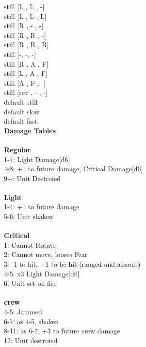 still [L ,  L ,  -] \\
still [L ,  L ,  L] \\
still [R ,  - ,  -] \\
still [R ,  R ,  -] \\
still [R ,  R ,  R] \\
still [-, -, -] \\
still [R ,  A ,  F] \\
still [L ,  A ,  F] \\
still [A ,  F ,  -] \\
still [rev ,  - ,  -] \\
default still \\
default slow \\
default fast \\


{\bf Damage Tables} \\
\ \\ {\bf Regular } \\
1-4: Light Damage[d6] \\
4-8: +1 to future damage, Critical Damage[d6] \\
9+: Unit Destroied \\
\ \\ {\bf Light } \\
1-4: +1 to future damage \\
5-6: Unit shaken \\
\ \\ {\bf Critical } \\
1: Cannot Rotate \\
2: Cannot move, looses Fear \\
3: -1 to hit, +1 to be hit (ranged and assault) \\
4-5: x3 Light Damage[d6] \\
6: Unit set on fire \\
\ \\ {\bf crew } \\
4-5: Jammed \\
6-7: as 4-5, shaken \\
8-11: as 6-7, +3 to future crew damage \\
12: Unit destroied \\










